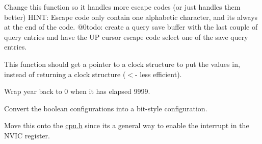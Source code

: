 
\begin{DoxyRefList}
\item[Global \mbox{\hyperlink{query__handler_8c_a08c12c2ca3ca95c9d0ccd685f57b3cae}{Cursor\+Code\+Check}} (circular\+\_\+buffer\+\_\+t $\ast$rx\+\_\+buf)]\label{todo__todo000003}%
%
Change this function so it handles more escape codes (or just handles them better) H\+I\+NT\+: Escape code only contain one alphabetic character, and it\textquotesingle{}s always at the end of the code. @0todo\+: create a query save buffer with the last couple of query entries and have the \textquotesingle{}UP cursor\textquotesingle{} escape code select one of the save query entries.  
\item[Global \mbox{\hyperlink{systime_8c_a366578f4517a84264aac2948894829fa}{systime\+\_\+\+Convert\+Tick\+Counter}} (uint32\+\_\+t t\+\_\+count)]\label{todo__todo000005}%
%
This function should get a pointer to a clock structure to put the values in, instead of returning a clock structure ($<$-\/ less efficient).  
\item[Global \mbox{\hyperlink{systime_8c_a1834094b1efac7c6d822a015c7d511ba}{systime\+\_\+\+Inc\+Date\+\_\+callback}} (void)]\label{todo__todo000004}%
%
Wrap year back to 0 when it has elapsed 9999.  
\item[Global \mbox{\hyperlink{uart_8c_ad35da456a0bfc73e5a9c6dfbfb420552}{U\+A\+R\+T0\+\_\+\+Init}} (uart\+\_\+descriptor\+\_\+t $\ast$descriptor)]\label{todo__todo000001}%
%
Convert the boolean configurations into a bit-\/style configuration.  
\item[Global \mbox{\hyperlink{uart_8c_a13bce21e1f2ea51aa4e09f2458e4e983}{U\+A\+R\+T0\+\_\+\+Interrupt\+Enable}} (unsigned long Interrupt\+Index)]\label{todo__todo000002}%
%
Move this onto the \mbox{\hyperlink{cpu_8h}{cpu.\+h}} since it\textquotesingle{}s a general way to enable the interrupt in the N\+V\+IC register. 
\end{DoxyRefList}